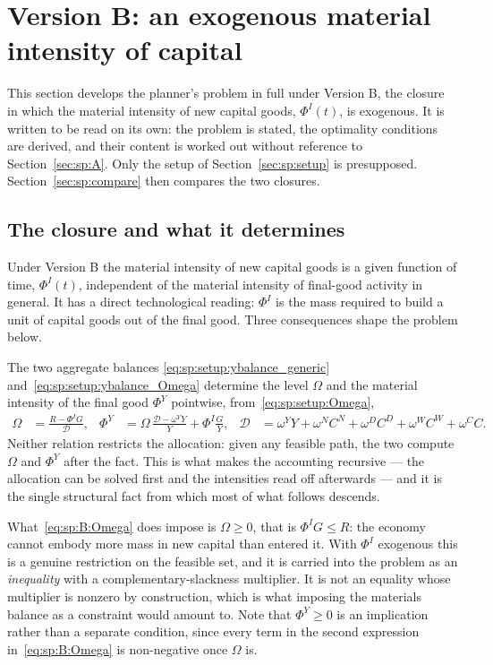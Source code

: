 \section{Version B: an exogenous material intensity of capital}\label{sec:sp:B}

This section develops the planner's problem in full under Version B, the closure in which the material
intensity of new capital goods, $\Phi^I(t)$, is exogenous. It is written to be read on its own: the
problem is stated, the optimality conditions are derived, and their content is worked out without
reference to Section~\ref{sec:sp:A}. Only the setup of Section~\ref{sec:sp:setup} is presupposed.
Section~\ref{sec:sp:compare} then compares the two closures.


\subsection{The closure and what it determines}\label{sec:sp:B:closure}

Under Version B the material intensity of new capital goods is a given function of time, $\Phi^I(t)$,
independent of the material intensity of final-good activity in general. It has a direct technological
reading: $\Phi^I$ is the mass required to build a unit of capital goods out of the final good. Three
consequences shape the problem below.

 The two aggregate balances
\eqref{eq:sp:setup:ybalance_generic} and~\eqref{eq:sp:setup:ybalance_Omega} determine the level $\Omega$
and the material intensity of the final good $\Phi^Y$ pointwise, from~\eqref{eq:sp:setup:Omega},
\begin{align}
\Omega &= \frac{R-\Phi^IG}{\mathcal D},
&
\Phi^Y &= \Omega\,\frac{\mathcal D-\omega^YY}{Y}+\Phi^I\frac{G}{Y},
&
\mathcal D &= \omega^YY+\omega^{N}C^N+\omega^{D}C^D+\omega^WC^W+\omega^CC .
\label{eq:sp:B:Omega}
\end{align}
Neither relation restricts the allocation: given any feasible path, the two compute $\Omega$ and
$\Phi^Y$ after the fact. This is what makes the accounting recursive --- the allocation can be solved
first and the intensities read off afterwards --- and it is the single structural fact from which most
of what follows descends.

 What~\eqref{eq:sp:B:Omega} does impose is $\Omega\ge0$,
that is $\Phi^IG\le R$: the economy cannot embody more mass in new capital than entered it. With
$\Phi^I$ exogenous this is a genuine restriction on the feasible set, and it is carried into the
problem as an \emph{inequality} with a complementary-slackness multiplier. It is not an equality
whose multiplier is nonzero by construction, which is what imposing the materials balance as a
constraint would amount to. Note that $\Phi^Y\ge0$ is an implication rather than a separate condition,
since every term in the second expression in~\eqref{eq:sp:B:Omega} is non-negative once $\Omega$ is.

